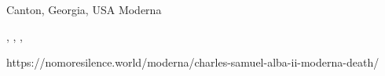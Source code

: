           {Canton, Georgia, USA}
          {}
          {Moderna}
          {}
          {
            ,
            ,
            ,
            
          }
          {https://nomoresilence.world/moderna/charles-samuel-alba-ii-moderna-death/}


